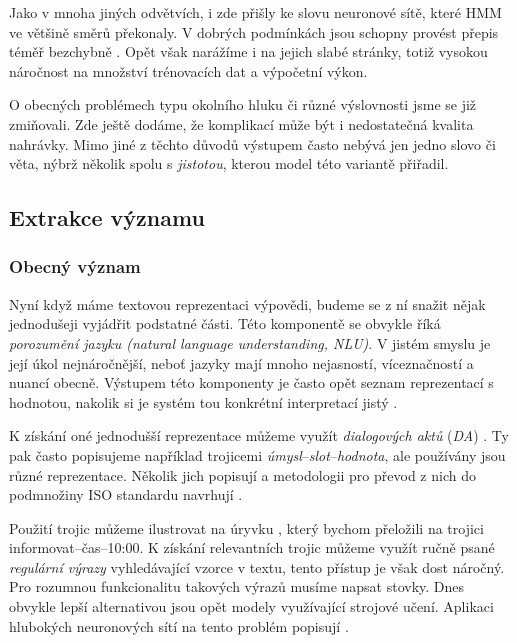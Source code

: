 Jako v mnoha jiných odvětvích, i zde přišly ke slovu neuronové sítě, které HMM
ve většině směrů překonaly. V dobrých podmínkách jsou schopny provést přepis
téměř bezchybně \citep{zhang_pushing_2020}. Opět však narážíme i na jejich slabé stránky,
totiž vysokou náročnost na množství trénovacích dat a výpočetní výkon.

O obecných problémech typu okolního hluku či různé výslovnosti jsme se
již zmiňovali. Zde ještě dodáme, že komplikací může být i nedostatečná kvalita
nahrávky. Mimo jiné z těchto důvodů výstupem často nebývá jen jedno
slovo či věta, nýbrž několik spolu s \textit{jistotou}, kterou model této
variantě přiřadil.

\subsection{Extrakce významu}\label{nlu}

\subsubsection{Obecný význam}
Nyní když máme textovou reprezentaci výpovědi, budeme se z ní snažit nějak
jednodušeji vyjádřit podstatné části. Této komponentě se obvykle říká
\textit{porozumění jazyku (natural language understanding, NLU)}. V jistém
smyslu je její úkol nejnáročnější, neboť jazyky mají mnoho nejasností,
víceznačností a nuancí obecně. Výstupem této komponenty je často opět
seznam reprezentací s hodnotou, nakolik si je systém tou konkrétní
interpretací jistý \citep[sekce 4.3]{gao_neural_2019}.

K získání oné jednodušší reprezentace můžeme využít \textit{dialogových aktů}
(\textit{DA}) \citep[strana 494]{jurafsky_slp_2020}. Ty pak
často popisujeme například trojicemi \textit{úmysl}--\textit{slot}--\textit{hodnota},
ale používány jsou různé reprezentace. Několik jich popisují a
metodologii pro převod z nich do podmnožiny
ISO standardu navrhují \citet{mezza_iso-standard_2018}.

Použití trojic můžeme ilustrovat na úryvku , který bychom
přeložili na trojici
informovat--čas--10:00. K získání relevantních trojic můžeme využít ručně
psané \textit{regulární výrazy} vyhledávající vzorce v textu, tento přístup
je však dost náročný. Pro rozumnou funkcionalitu takových výrazů musíme napsat
stovky. Dnes obvykle lepší alternativou jsou opět modely využívající strojové
učení. Aplikaci hlubokých neuronových sítí na tento problém
popisují \citet{liu_multi-task_2019}.

